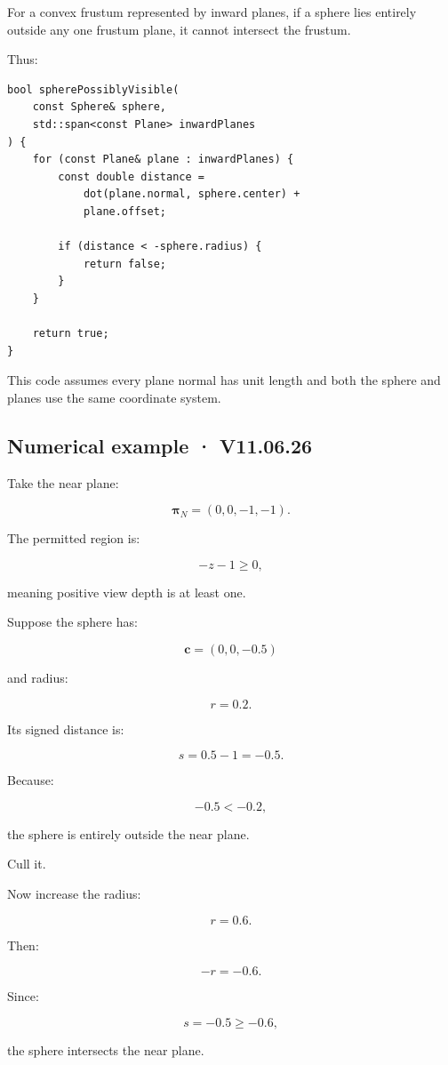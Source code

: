 For a convex frustum represented by inward planes, if a sphere lies entirely outside any one frustum plane, it cannot intersect the frustum.

Thus:

\begin{verbatim}
bool spherePossiblyVisible(
    const Sphere& sphere,
    std::span<const Plane> inwardPlanes
) {
    for (const Plane& plane : inwardPlanes) {
        const double distance =
            dot(plane.normal, sphere.center) +
            plane.offset;

        if (distance < -sphere.radius) {
            return false;
        }
    }

    return true;
}
\end{verbatim}

This code assumes every plane normal has unit length and both the sphere and planes use the same coordinate system.

\subsection{Numerical example · V11.06.26}\label{02-foundations-ii-ch034-numerical-example-v11.06.26}

Take the near plane:

\[
 \boldsymbol\pi_N=(0,0,-1,-1).
\]

The permitted region is:

\[
 -z-1\ge0,
\]

meaning positive view depth is at least one.

Suppose the sphere has:

\[
 \mathbf c=(0,0,-0.5)
\]

and radius:

\[
 r=0.2.
\]

Its signed distance is:

\[
 s=0.5-1=-0.5.
\]

Because:

\[
 -0.5<-0.2,
\]

the sphere is entirely outside the near plane.

Cull it.

Now increase the radius:

\[
 r=0.6.
\]

Then:

\[
 -r=-0.6.
\]

Since:

\[
 s=-0.5\ge-0.6,
\]

the sphere intersects the near plane.

